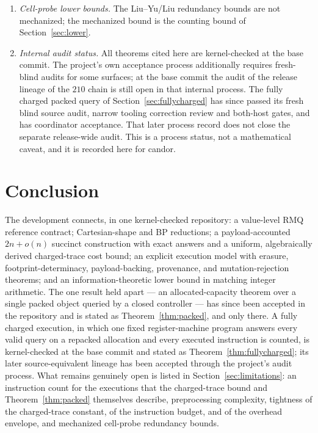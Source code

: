 \documentclass[11pt]{article}
\newcommand{\ledger}[1]{}
\theoremstyle{definition}
\theoremstyle{remark}
\begin{document}
\begin{enumerate}
  attain the envelope, and the envelope is not claimed comparable to
  Fischer--Heun redundancy.\ledger{L-OPEN-04}
\item \emph{Cell-probe lower bounds.} The Liu--Yu/Liu redundancy bounds
  are not mechanized; the mechanized bound is the counting bound of
  Section~\ref{sec:lower}.\ledger{L-OPEN-05}
\item \emph{Internal audit status.} All theorems cited here are
  kernel-checked at the base commit. The project's own acceptance process
  additionally requires fresh-blind audits for some surfaces; at the base
  commit the audit of the release lineage of the $210$ chain is still open
  in that internal process. The fully charged packed query of
  Section~\ref{sec:fullycharged} has since passed its fresh blind source audit, narrow tooling correction review and both-host gates, and has coordinator acceptance. That later process record does not close the separate release-wide audit. This is a process status,
  not a mathematical caveat, and it is recorded here for candor.
\end{enumerate}

\section{Conclusion}\label{sec:conclusion}

The development connects, in one kernel-checked repository: a value-level
RMQ reference contract; Cartesian-shape and BP reductions; a
payload-accounted $2n + o(n)$ succinct construction with exact answers and
a uniform, algebraically derived charged-trace cost bound; an explicit
execution model with erasure, footprint-determinacy, payload-backing,
provenance, and mutation-rejection theorems; and an information-theoretic
lower bound in matching integer arithmetic. The one result held apart ---
an allocated-capacity theorem over a single packed object queried by a
closed controller --- has since been accepted in the repository and is
stated as Theorem~\ref{thm:packed}, and only there. A fully charged
execution, in which one fixed register-machine program answers every valid
query on a repacked allocation and every executed instruction is counted, is
kernel-checked at the base commit and stated as Theorem~\ref{thm:fullycharged}; its later source-equivalent lineage has been accepted through the project's audit process. What remains genuinely open is listed in
Section~\ref{sec:limitations}: an instruction count for the executions that
the charged-trace bound and Theorem~\ref{thm:packed} themselves describe,
preprocessing complexity, tightness of the charged-trace constant, of the
instruction budget, and of the overhead envelope, and mechanized cell-probe
redundancy bounds.



\end{document}
